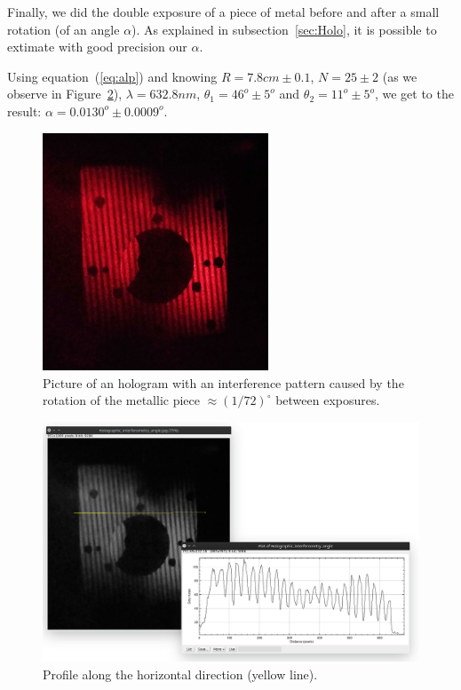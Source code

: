 \documentclass[11pt,a4paper]{article}
\begin{document}
Finally, we did the double exposure of a piece of metal before and after a small rotation (of an angle $\alpha$). As explained in subsection~\ref{sec:Holo}, it is possible to extimate with good precision our $\alpha$.

Using equation~(\ref{eq:alp}) and knowing $R=7.8cm\pm 0.1$, $N=25\pm 2$ (as we observe in Figure~\ref{fig:holographic_interferometry_angle_fringes}), $\lambda=632.8nm$, $\theta_1=46^o\pm 5^o$ and $\theta_2=11^o\pm 5^o$, we get to the result: $\alpha= 0.0130^o\pm 0.0009^o$.


\begin{figure}[ht]
\centering
\includegraphics[width=0.6\textwidth]{Holographic_interferometry_angle}
\caption{Picture of an hologram with an interference pattern caused by the rotation of the metallic piece $\approx (1/72)^\circ$ between exposures.}
\label{fig:holographic_interferometry_angle}
\end{figure}

\begin{figure}[ht]
\centering
\includegraphics[width=\textwidth]{Holographic_interferometry_angle_fringes}
\caption{Profile along the horizontal direction (yellow line).}
\label{fig:holographic_interferometry_angle_fringes}
\end{figure}
\end{document}
